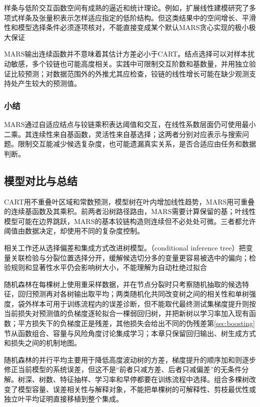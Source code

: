 样条与低阶交互函数空间有成熟的逼近和统计理论。例如，扩展线性建模研究了多项式样条及张量积表示怎样适应指定的低阶结构。但这类结果中的空间增长、平滑性和模型选择条件必须逐项核对，不能直接变成某个默认MARS贪心实现的极小极大保证

MARS输出连续函数并不意味着其估计方差必小于CART。结点选择可以对样本扰动敏感，多个铰链也可能高度相关。实践中可限制交互阶数和基数量，并用独立验证比较预测；对数据范围外的外推尤其应检查，铰链的线性增长可能在缺少观测支持处产生较大的预测值。

\subsubsection{小结}

MARS通过自适应结点与铰链乘积表达阈值和交互，在线性系数层面仍可使用最小二乘。其连续性来自基函数，灵活性来自基选择；这两者分别对应表示与搜索问题。限制交互能减少候选复杂度，也可能遗漏真实关系，是否合适应由任务和数据判断。

\subsection{模型对比与总结}

CART用不重叠叶区域和常数预测，模型树在叶内增加线性趋势，MARS用可重叠的连续基函数及其乘积。前两者沿树路径路由，MARS需要计算保留的基；叶线性模型可能在边界跳跃，MARS的基本铰链构造则连续但不必处处可微。三者都允许阈值由数据决定，却使用不同的复杂度控制。

相关工作还从选择偏差和集成方式改进树模型。（conditional inference tree）把变量关联检验与分裂位置选择分开，缓解候选切分多的变量更容易被选中的偏向；检验规则和显著性水平仍会影响树大小，不能理解为自动杜绝过拟合

随机森林在每棵树上使用重采样数据，并在节点分裂时只考察随机抽取的候选特征，回归预测再对各树输出取平均；两类随机化共同改变树之间的相关性和单树强度，袋外样本可用于训练流程内的误差诊断，但不能取代最终测试集梯度提升则按当前损失对预测值的负梯度逐轮拟合一棵弱回归树，并把新树以学习率加入现有函数；平方损失下的负梯度正是残差，其他损失会给出不同的伪残差第\ref{sec:boosting}节从函数组合、容量与风险角度讨论集成学习；本章只保留回归输出、树生成方式和损失之间的机制地图。

随机森林的并行平均主要用于降低高度波动树的方差，梯度提升的顺序加和则逐步修正当前模型的系统误差，但这不是“前者只减方差、后者只减偏差”的无条件分解。树深、树数、特征抽样、学习率和早停都要在训练流程中选择。组合多棵树改变了模型容量、误差相关性与解释对象，不能把单棵树的可解释性、剪枝最优性或独立叶平均证明直接移植到整个集成。

